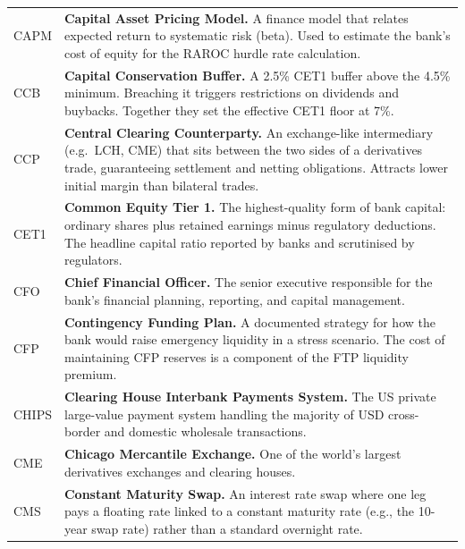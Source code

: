 \documentclass[12pt,a4paper]{article}
\begin{document}
\begin{longtable}{p{3.2cm} p{10.8cm}}
  CAPM  & \textbf{Capital Asset Pricing Model.}
          A finance model that relates expected return to systematic risk
          (beta).  Used to estimate the bank's cost of equity for the RAROC
          hurdle rate calculation. \\[4pt]

  CCB   & \textbf{Capital Conservation Buffer.}
          A 2.5\% CET1 buffer above the 4.5\% minimum.  Breaching it triggers
          restrictions on dividends and buybacks.  Together they set the
          effective CET1 floor at 7\%. \\[4pt]

  CCP   & \textbf{Central Clearing Counterparty.}
          An exchange-like intermediary (e.g.\ LCH, CME) that sits between
          the two sides of a derivatives trade, guaranteeing settlement and
          netting obligations.  Attracts lower initial margin than bilateral
          trades. \\[4pt]

  CET1  & \textbf{Common Equity Tier 1.}
          The highest-quality form of bank capital: ordinary shares plus
          retained earnings minus regulatory deductions.  The headline capital
          ratio reported by banks and scrutinised by regulators. \\[4pt]

  CFO   & \textbf{Chief Financial Officer.}
          The senior executive responsible for the bank's financial planning,
          reporting, and capital management. \\[4pt]

  CFP   & \textbf{Contingency Funding Plan.}
          A documented strategy for how the bank would raise emergency liquidity
          in a stress scenario.  The cost of maintaining CFP reserves is a
          component of the FTP liquidity premium. \\[4pt]

  CHIPS & \textbf{Clearing House Interbank Payments System.}
          The US private large-value payment system handling the majority of
          USD cross-border and domestic wholesale transactions. \\[4pt]

  CME   & \textbf{Chicago Mercantile Exchange.}
          One of the world's largest derivatives exchanges and clearing houses. \\[4pt]

  CMS   & \textbf{Constant Maturity Swap.}
          An interest rate swap where one leg pays a floating rate linked to a
          constant maturity rate (e.g., the 10-year swap rate) rather than a
          standard overnight rate. \\[4pt]


\end{longtable}
\end{document}
